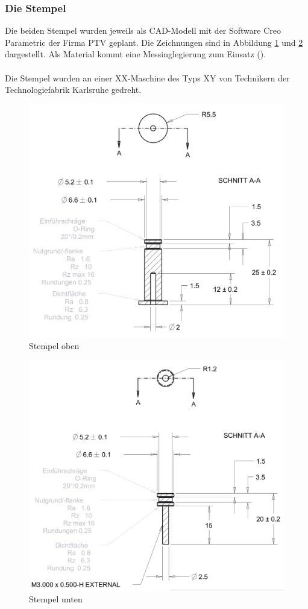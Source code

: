 \documentclass[a4paper, 11pt, headsepline,footsepline,twoside,abstract]{scrbook}
\begin{document}
\subsubsection{Die Stempel}
Die beiden Stempel wurden jeweils als CAD-Modell mit der Software Creo Parametric der Firma PTV geplant. Die Zeichnungen sind in Abbildung \ref{stempel_oben} und \ref{stempel_unten} dargestellt. Als Material kommt eine Messinglegierung zum Einsatz (). 
\\\\
Die Stempel wurden an einer XX-Maschine des Typs XY von Technikern der Technologiefabrik Karlsruhe gedreht.
\begin{figure}
	\centering
	\includegraphics[width=0.7\columnwidth]{images/stempel_oben.png}
	\caption{Stempel oben}
	\label{stempel_oben}
\end{figure}
\begin{figure}
	\centering
	\includegraphics[width=0.7\columnwidth]{images/stempel_unten.png}
	\caption{Stempel unten}
	\label{stempel_unten}
\end{figure}
\end{document}
